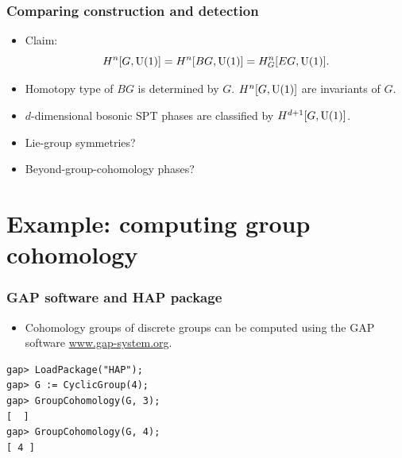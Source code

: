 \documentclass[xcolor=table, aspectratio=43,ignorenonframetext]{beamer}
\newcommand{\uone}{\text U(1)}
\begin{document}
\begin{frame}
	\frametitle{Comparing construction and detection}
	\begin{itemize}
		\item Claim:
		\[H^n[G, \uone] = H^n[BG, \uone] = H^n_G[EG, \uone].\]
		\item Homotopy type of $BG$ is determined by $G$. $H^n[G, \uone]$ are invariants of $G$.
		\item $d$-dimensional bosonic SPT phases are classified by
		$H^{d+1}[G, \uone]$.
		\item Lie-group symmetries?
		\item Beyond-group-cohomology phases?
	\end{itemize}
\end{frame}

\section{Example: computing group cohomology}

\begin{frame}[fragile]
	\frametitle{GAP software and HAP package}
	\begin{itemize}
		\item Cohomology groups of discrete groups can be computed using the GAP software \url{www.gap-system.org}.
	\end{itemize}
	\begin{verbatim}
gap> LoadPackage("HAP");
gap> G := CyclicGroup(4);
gap> GroupCohomology(G, 3);
[  ]
gap> GroupCohomology(G, 4);
[ 4 ]
	\end{verbatim}
\end{frame}
\end{document}
